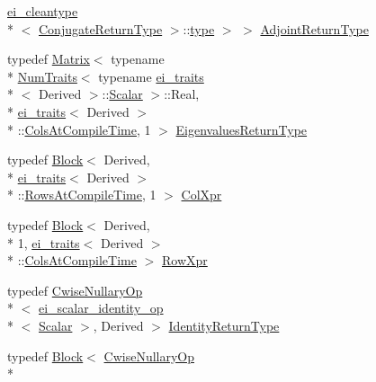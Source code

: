 \begin{DoxyCompactItemize}
\hyperlink{structei__cleantype}{ei\-\_\-cleantype}\\*
$<$ \hyperlink{class_matrix_base_a91f43c00ced2c79a68df37e6251b0db5}{Conjugate\-Return\-Type} $>$\-::\hyperlink{glext_8h_a7d05960f4f1c1b11f3177dc963a45d86}{type} $>$ $>$ \hyperlink{class_matrix_base_ab0fa2c6c89d49eb6021904ed1e016704}{Adjoint\-Return\-Type}
\item 
typedef \hyperlink{class_matrix}{Matrix}$<$ typename \\*
\hyperlink{struct_num_traits}{Num\-Traits}$<$ typename \hyperlink{structei__traits}{ei\-\_\-traits}\\*
$<$ Derived $>$\-::\hyperlink{class_matrix_base_a625df8339dc2d816cbc0fd66e7dadaf5}{Scalar} $>$\-::Real, \\*
\hyperlink{structei__traits}{ei\-\_\-traits}$<$ Derived $>$\\*
\-::\hyperlink{class_matrix_base_aaa53a8ec1bc1ba52b1e50631dac15d6da359babfd1277ae780433d99b383e00e8}{Cols\-At\-Compile\-Time}, 1 $>$ \hyperlink{class_matrix_base_ab041ffd1da23ffd76ad673bd73426d38}{Eigenvalues\-Return\-Type}
\item 
typedef \hyperlink{class_block}{Block}$<$ Derived, \\*
\hyperlink{structei__traits}{ei\-\_\-traits}$<$ Derived $>$\\*
\-::\hyperlink{class_matrix_base_aaa53a8ec1bc1ba52b1e50631dac15d6da10c48c1361376cbd5ef62a18966f2691}{Rows\-At\-Compile\-Time}, 1 $>$ \hyperlink{class_matrix_base_a6363c7feaa2dd9f84d98923d76d4ca8a}{Col\-Xpr}
\item 
typedef \hyperlink{class_block}{Block}$<$ Derived, \\*
1, \hyperlink{structei__traits}{ei\-\_\-traits}$<$ Derived $>$\\*
\-::\hyperlink{class_matrix_base_aaa53a8ec1bc1ba52b1e50631dac15d6da359babfd1277ae780433d99b383e00e8}{Cols\-At\-Compile\-Time} $>$ \hyperlink{class_matrix_base_a8611a38e5109647fef363441928f4e73}{Row\-Xpr}
\item 
typedef \hyperlink{class_cwise_nullary_op}{Cwise\-Nullary\-Op}\\*
$<$ \hyperlink{structei__scalar__identity__op}{ei\-\_\-scalar\-\_\-identity\-\_\-op}\\*
$<$ \hyperlink{class_matrix_base_a625df8339dc2d816cbc0fd66e7dadaf5}{Scalar} $>$, Derived $>$ \hyperlink{class_matrix_base_a2131370fa10c308c9a39fab0c81ebcd1}{Identity\-Return\-Type}
\item 
typedef \hyperlink{class_block}{Block}$<$ \hyperlink{class_cwise_nullary_op}{Cwise\-Nullary\-Op}\\*

\end{DoxyCompactItemize}
